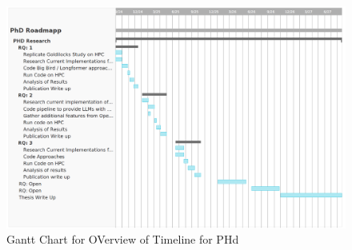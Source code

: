 \documentclass[../main.tex]{subfiles}
\begin{document}
\begin{landscape}
\begin{figure}
\centering
        \includegraphics[width=1\linewidth]{sections//images/Gantt1.png}
        \caption{Gantt Chart for OVerview of Timeline for PHd}
        \label{fig:gantt}
    \end{figure}
\end{landscape}
    

\begin{landscape}

\end{landscape}
\end{document}
